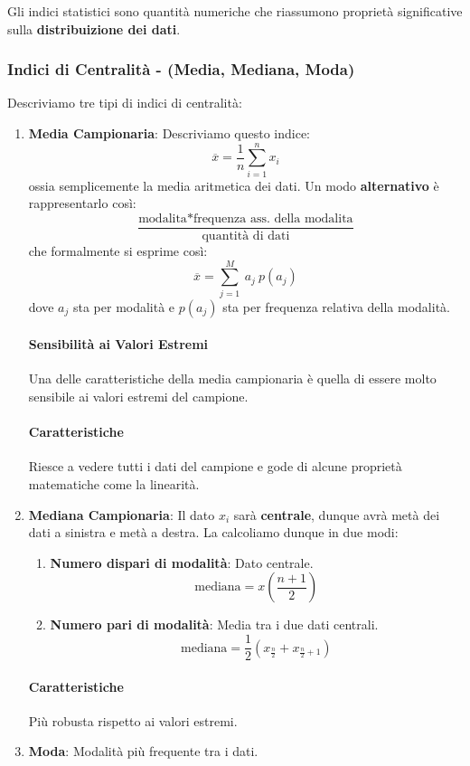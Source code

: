 \documentclass{article}
\begin{document}
Gli indici statistici sono quantità numeriche che riassumono proprietà significative sulla \textbf{distribuizione dei dati}.

\subsubsection{Indici di Centralità - (Media, Mediana, Moda)}

Descriviamo tre tipi di indici di centralità:

\begin{enumerate}
    \item \textbf{Media Campionaria}: Descriviamo questo indice:
    \[ \overline{x} = \frac{1}{n}\sum_{i=1}^{n} x_{i}\]
    ossia semplicemente la media aritmetica dei dati.
    Un modo \textbf{alternativo} è rappresentarlo così:
    \vspace*{5px}
    \[ \frac{\text{modalita}*\text{frequenza ass. della modalita}}{\text{quantità di dati}} \]
    \vspace*{5px}
    che formalmente si esprime così:
    \[ \overline{x} = \sum_{j=1}^{M}\:a_{j}\:p(a_{j}) \]
    dove $a_{j}$ sta per modalità e $p(a_{j})$ sta per frequenza relativa della modalità.
    \paragraph{Sensibilità ai Valori Estremi} Una delle caratteristiche della media campionaria è quella di essere molto sensibile ai valori estremi del campione.
    \paragraph{Caratteristiche} Riesce a vedere tutti i dati del campione e gode di alcune proprietà matematiche come la linearità.
    \item \textbf{Mediana Campionaria}: Il dato $x_{i}$ sarà \textbf{centrale}, dunque avrà metà dei dati a sinistra e metà a destra. La calcoliamo dunque in due modi:
    \begin{enumerate}
        \item \textbf{Numero dispari di modalità}: Dato centrale.
        \[ \text{mediana} = x(\frac{n+1}{2}) \]
        \item \textbf{Numero pari di modalità}: Media tra i due dati centrali.
        \[ \text{mediana} = \frac{1}{2}(x_{\frac{n}{2}} + x_{\frac{n}{2}+1}) \]
    \end{enumerate}
    \paragraph{Caratteristiche} Più robusta rispetto ai valori estremi.
    \item \textbf{Moda}: Modalità più frequente tra i dati.
\end{enumerate}
\end{document}
